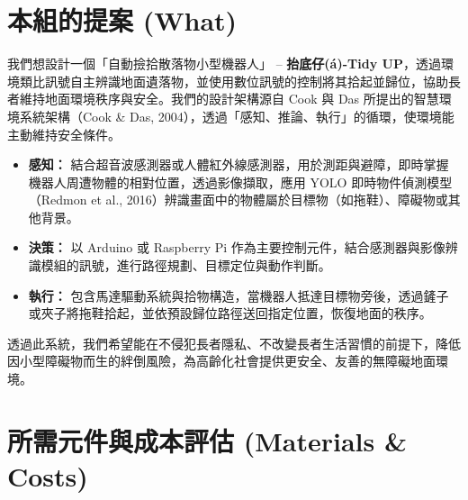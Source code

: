 \documentclass[12pt]{article}
\begin{document}
\section{本組的提案 (What)}
我們想設計一個「自動撿拾散落物小型機器人」 -- \textbf{抬底仔(á)-Tidy UP}，透過環境類比訊號自主辨識地面遺落物，並使用數位訊號的控制將其拾起並歸位，協助長者維持地面環境秩序與安全。我們的設計架構源自 Cook 與 Das 所提出的智慧環境系統架構（Cook \& Das, 2004），透過「感知、推論、執行」的循環，使環境能主動維持安全條件。

\begin{itemize}
  \setlength{\leftmargin}{2em}
  \setlength{\itemsep}{0.5em}
  \item \textbf{感知：} 結合超音波感測器或人體紅外線感測器，用於測距與避障，即時掌握機器人周遭物體的相對位置，透過影像擷取，應用 YOLO 即時物件偵測模型（Redmon et al., 2016）辨識畫面中的物體屬於目標物（如拖鞋）、障礙物或其他背景。
  \item \textbf{決策：} 以 Arduino 或 Raspberry Pi 作為主要控制元件，結合感測器與影像辨識模組的訊號，進行路徑規劃、目標定位與動作判斷。
  \item \textbf{執行：} 包含馬達驅動系統與拾物構造，當機器人抵達目標物旁後，透過鏟子或夾子將拖鞋拾起，並依預設歸位路徑送回指定位置，恢復地面的秩序。
\end{itemize}

透過此系統，我們希望能在不侵犯長者隱私、不改變長者生活習慣的前提下，降低因小型障礙物而生的絆倒風險，為高齡化社會提供更安全、友善的無障礙地面環境。

\section{所需元件與成本評估 (Materials \& Costs)}
\end{document}
